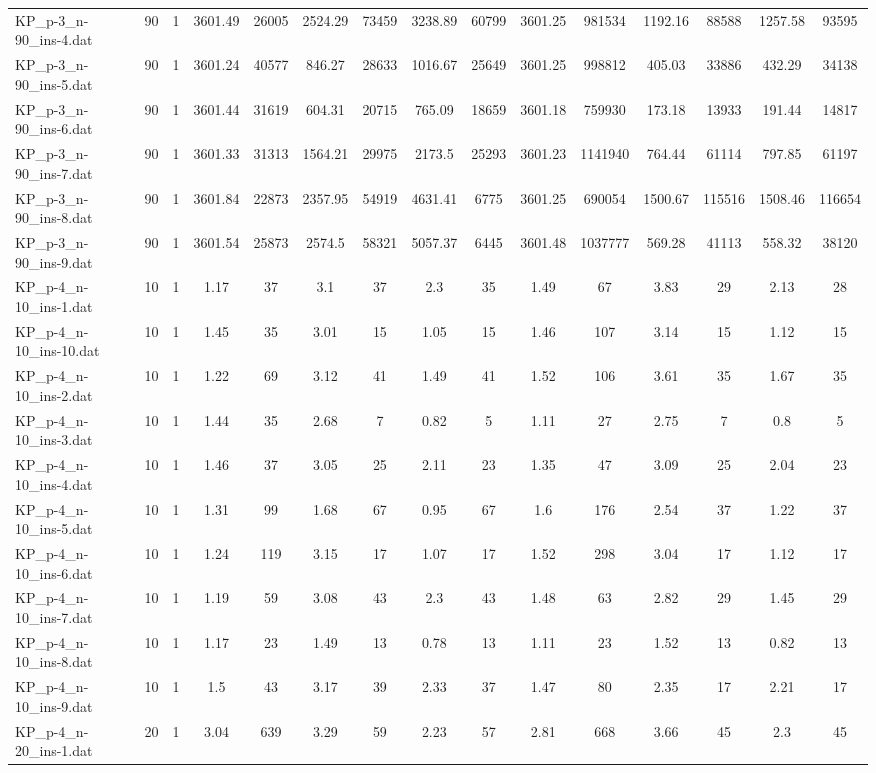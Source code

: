 \begin{table}[!ht]
{\begin{tabular}{lcccccccccccccc}
KP\_p-3\_n-90\_ins-4.dat & 90 & 1 & 3601.49 & 26005 & 2524.29 & 73459 & 3238.89 & 60799 & 3601.25 & 981534 & 1192.16 & 88588 & 1257.58 & 93595 \\
KP\_p-3\_n-90\_ins-5.dat & 90 & 1 & 3601.24 & 40577 & 846.27 & 28633 & 1016.67 & 25649 & 3601.25 & 998812 & 405.03 & 33886 & 432.29 & 34138 \\
KP\_p-3\_n-90\_ins-6.dat & 90 & 1 & 3601.44 & 31619 & 604.31 & 20715 & 765.09 & 18659 & 3601.18 & 759930 & 173.18 & 13933 & 191.44 & 14817 \\
KP\_p-3\_n-90\_ins-7.dat & 90 & 1 & 3601.33 & 31313 & 1564.21 & 29975 & 2173.5 & 25293 & 3601.23 & 1141940 & 764.44 & 61114 & 797.85 & 61197 \\
KP\_p-3\_n-90\_ins-8.dat & 90 & 1 & 3601.84 & 22873 & 2357.95 & 54919 & 4631.41 & 6775 & 3601.25 & 690054 & 1500.67 & 115516 & 1508.46 & 116654 \\
KP\_p-3\_n-90\_ins-9.dat & 90 & 1 & 3601.54 & 25873 & 2574.5 & 58321 & 5057.37 & 6445 & 3601.48 & 1037777 & 569.28 & 41113 & 558.32 & 38120 \\
KP\_p-4\_n-10\_ins-1.dat & 10 & 1 & 1.17 & 37 & 3.1 & 37 & 2.3 & 35 & 1.49 & 67 & 3.83 & 29 & 2.13 & 28 \\
KP\_p-4\_n-10\_ins-10.dat & 10 & 1 & 1.45 & 35 & 3.01 & 15 & 1.05 & 15 & 1.46 & 107 & 3.14 & 15 & 1.12 & 15 \\
KP\_p-4\_n-10\_ins-2.dat & 10 & 1 & 1.22 & 69 & 3.12 & 41 & 1.49 & 41 & 1.52 & 106 & 3.61 & 35 & 1.67 & 35 \\
KP\_p-4\_n-10\_ins-3.dat & 10 & 1 & 1.44 & 35 & 2.68 & 7 & 0.82 & 5 & 1.11 & 27 & 2.75 & 7 & 0.8 & 5 \\
KP\_p-4\_n-10\_ins-4.dat & 10 & 1 & 1.46 & 37 & 3.05 & 25 & 2.11 & 23 & 1.35 & 47 & 3.09 & 25 & 2.04 & 23 \\
KP\_p-4\_n-10\_ins-5.dat & 10 & 1 & 1.31 & 99 & 1.68 & 67 & 0.95 & 67 & 1.6 & 176 & 2.54 & 37 & 1.22 & 37 \\
KP\_p-4\_n-10\_ins-6.dat & 10 & 1 & 1.24 & 119 & 3.15 & 17 & 1.07 & 17 & 1.52 & 298 & 3.04 & 17 & 1.12 & 17 \\
KP\_p-4\_n-10\_ins-7.dat & 10 & 1 & 1.19 & 59 & 3.08 & 43 & 2.3 & 43 & 1.48 & 63 & 2.82 & 29 & 1.45 & 29 \\
KP\_p-4\_n-10\_ins-8.dat & 10 & 1 & 1.17 & 23 & 1.49 & 13 & 0.78 & 13 & 1.11 & 23 & 1.52 & 13 & 0.82 & 13 \\
KP\_p-4\_n-10\_ins-9.dat & 10 & 1 & 1.5 & 43 & 3.17 & 39 & 2.33 & 37 & 1.47 & 80 & 2.35 & 17 & 2.21 & 17 \\
KP\_p-4\_n-20\_ins-1.dat & 20 & 1 & 3.04 & 639 & 3.29 & 59 & 2.23 & 57 & 2.81 & 668 & 3.66 & 45 & 2.3 & 45 \\

\end{tabular}}
\end{table}
